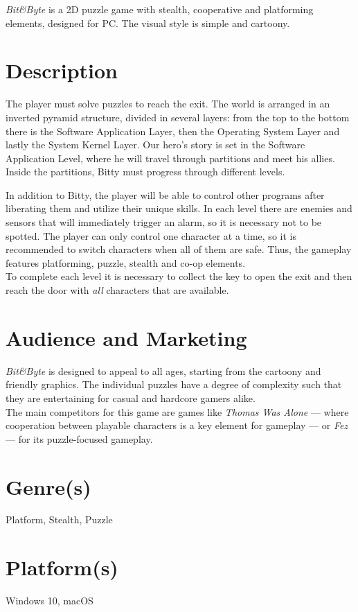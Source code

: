 \documentclass[12pt, a4paper]{report}
\begin{document}
\textit{Bit&Byte} is a 2D puzzle game with stealth, cooperative and platforming elements, designed for PC. The visual style is simple and cartoony.\\

\section*{Description}
The player must solve puzzles to reach the exit. The world is arranged in an inverted pyramid structure, divided in several layers: from the top to the bottom there is the Software Application Layer, then the Operating System Layer and lastly the System Kernel Layer. Our hero’s story is set in the Software Application Level, where he will travel through partitions and meet his allies. Inside the partitions, Bitty must progress through different levels.

In addition to Bitty, the player will be able to control other programs after liberating them and utilize their unique skills. In each level there are enemies and sensors that will immediately trigger an alarm, so it is necessary not to be spotted. The player can only control one character at a time, so it is recommended to switch characters when all of them are safe.
Thus, the gameplay features platforming, puzzle, stealth and co-op elements.\\

To complete each level it is necessary to collect the key to open the exit and then reach the door with \textit{all} characters that are available.

\section*{Audience and Marketing}
\textit{Bit&Byte} is designed to appeal to all ages, starting from the cartoony and friendly graphics. The individual puzzles have a degree of complexity such that they are entertaining for casual and hardcore gamers alike.\\
The main competitors for this game are games like \textit{Thomas Was Alone} --- where cooperation between playable characters is a key element for gameplay --- or \textit{Fez} --- for its puzzle-focused gameplay.

\section*{Genre(s)}
Platform, Stealth, Puzzle
\section*{Platform(s)}
Windows 10, macOS
\end{document}
